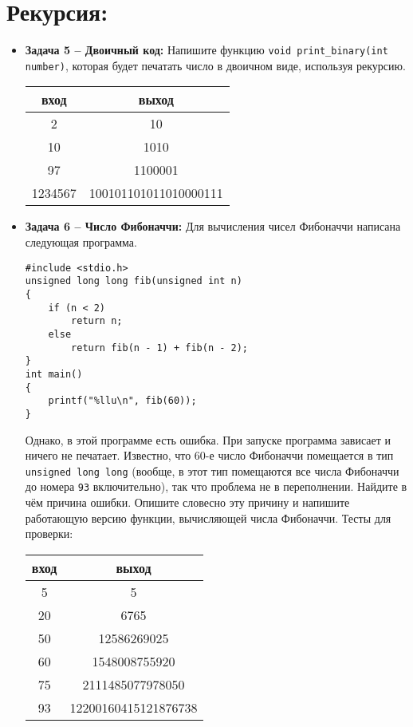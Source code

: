 \documentclass{article}
\begin{document}
\section*{Рекурсия:}
\begin{itemize}
\item \textbf{Задача 5 -- Двоичный код:} Напишите функцию \texttt{void print\_binary(int number)}, которая будет печатать число в двоичном виде, используя рекурсию.
\begin{center}
\begin{tabular}{ c c }
 вход & выход \\ \hline
 2 & 10  \\ 
 10 & 1010  \\
 97 & 1100001 \\
 1234567 & 100101101011010000111\\
\end{tabular}
\end{center}

\item \textbf{Задача 6 -- Число Фибоначчи:} Для вычисления чисел Фибоначчи написана следующая программа.
\begin{lstlisting}
#include <stdio.h>
unsigned long long fib(unsigned int n)
{
    if (n < 2)
        return n;
    else
        return fib(n - 1) + fib(n - 2);
}
int main()
{    
    printf("%llu\n", fib(60));
}
\end{lstlisting}
Однако, в этой программе есть ошибка. При запуске программа зависает и ничего не печатает.  Известно, что 60-е число Фибоначчи помещается в тип \texttt{unsigned long long} (вообще, в этот тип помещаются все числа Фибоначчи до номера \texttt{93} включительно), так что проблема не в переполнении. Найдите в чём причина ошибки. Опишите словесно эту причину и напишите работающую версию функции, вычисляющей числа Фибоначчи. Тесты для проверки:

\begin{center}
\begin{tabular}{ c c }
 вход & выход \\ \hline
 5 & 5  \\ 
 20 & 6765 \\ 
 50 & 12586269025 \\ 
 60 & 1548008755920 \\ 
 75 & 2111485077978050 \\
 93 & 12200160415121876738 \\   
\end{tabular}
\end{center}
\end{itemize}
\end{document}
